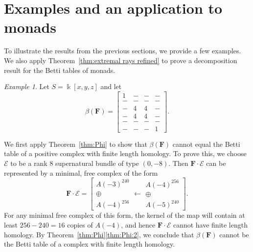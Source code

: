 \documentclass[12pt]{amsart}
\theoremstyle{definition}
\theoremstyle{remark}
\newtheorem{example}[lemma]{Example}
\newcommand{\kk}{\Bbbk}
\newcommand{\PP}{\mathbb{P}}
\newcommand{\cO}{\mathcal{O}}
\newcommand{\cE}{\mathcal{E}}
\newcommand{\FF}{\mathbf{F}}
\newcommand{\Sym}{\operatorname{Sym}} %
\begin{document}
\section{Examples and an application to monads}\label{sec:examples}
To illustrate the results from the previous sections, we provide a few examples.  We also apply Theorem~\ref{thm:extremal rays refined} to prove a decomposition result for the Betti tables of monads.
\begin{example}\label{ex:1441}
Let $S=\kk[x,y,z]$ and let
\begin{equation}\label{eqn:intro ex}
\beta(\FF)=\begin{bmatrix} 1&-&-&-\\ -&-&-&-\\-&4&4&-\\-&4&4&-\\-&-&-&-\\-&-&-&1 \end{bmatrix}.
\end{equation}


We first apply Theorem~\ref{thm:Phi} to show that $\beta(\FF)$ cannot equal the Betti table of a positive complex with finite length homology.  To prove this, we choose $\cE$ to be a rank $8$ supernatural bundle of type $(0,-8)$.  
Then $\FF\cdot \cE$ can be represented by a minimal, free complex of the form
\[
\FF\cdot \cE=\left[ \begin{matrix}A(-3)^{240}\\ \oplus \\A(-4)^{256}\end{matrix} \longleftarrow \begin{matrix}A(-4)^{256}\\\oplus \\ A(-5)^{240}\end{matrix}\right].
\]
For any minimal free complex of this form, the kernel of the map will contain at least $256-240=16$ copies of $A(-4)$, and hence $\FF\cdot \cE$ cannot have finite length homology.  By Theorem~\ref{thm:Phi}\eqref{thm:Phi:2}, we conclude that $\beta(\FF)$ cannot be the Betti table of a complex with finite length homology.


\end{example}
\end{document}
